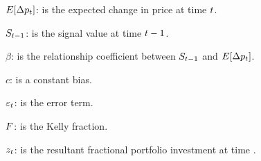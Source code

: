 \documentclass{article}
\begin{document}
$E[\Delta p_{t}]$: is the expected change in price at time $t$.

$S_{t-1}$: is the signal value at time $t-1$.

$\beta$: is the relationship coefficient between $S_{t-1}$ and $E[\Delta p_{t}]$.

$c$: is a constant bias.

$\varepsilon_{t}$: is the error term.

$F$: is the Kelly fraction.

$z_{t}$: is the resultant fractional portfolio investment at time \currenttime.


\keyterms
\furtherlinks %
\end{document}
